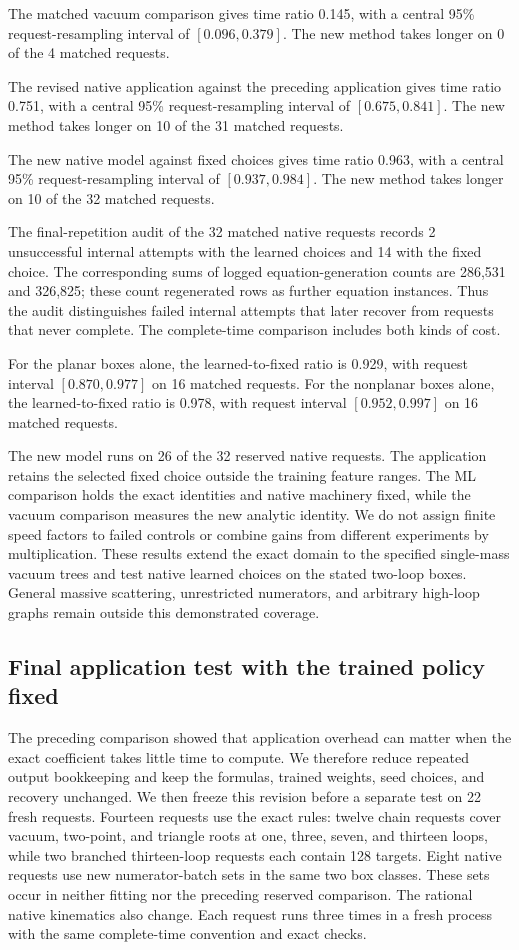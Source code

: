 The matched vacuum comparison gives time ratio 0.145, with a central 95\% request-resampling interval of $[0.096,0.379]$. The new method takes longer on 0 of the 4 matched requests.

The revised native application against the preceding application gives time ratio 0.751, with a central 95\% request-resampling interval of $[0.675,0.841]$. The new method takes longer on 10 of the 31 matched requests.

The new native model against fixed choices gives time ratio 0.963, with a central 95\% request-resampling interval of $[0.937,0.984]$. The new method takes longer on 10 of the 32 matched requests.

The final-repetition audit of the 32 matched native requests records 2 unsuccessful internal attempts with the learned choices and 14 with the fixed choice. The corresponding sums of logged equation-generation counts are 286,531 and 326,825; these count regenerated rows as further equation instances. Thus the audit distinguishes failed internal attempts that later recover from requests that never complete. The complete-time comparison includes both kinds of cost.

For the planar boxes alone, the learned-to-fixed ratio is 0.929, with request interval $[0.870,0.977]$ on 16 matched requests. For the nonplanar boxes alone, the learned-to-fixed ratio is 0.978, with request interval $[0.952,0.997]$ on 16 matched requests.

The new model runs on 26 of the 32 reserved native requests. The application retains the selected fixed choice outside the training feature ranges. The ML comparison holds the exact identities and native machinery fixed, while the vacuum comparison measures the new analytic identity. We do not assign finite speed factors to failed controls or combine gains from different experiments by multiplication. These results extend the exact domain to the specified single-mass vacuum trees and test native learned choices on the stated two-loop boxes. General massive scattering, unrestricted numerators, and arbitrary high-loop graphs remain outside this demonstrated coverage.

\subsection{Final application test with the trained policy fixed}
The preceding comparison showed that application overhead can matter when the exact coefficient takes little time to compute. We therefore reduce repeated output bookkeeping and keep the formulas, trained weights, seed choices, and recovery unchanged. We then freeze this revision before a separate test on 22 fresh requests. Fourteen requests use the exact rules: twelve chain requests cover vacuum, two-point, and triangle roots at one, three, seven, and thirteen loops, while two branched thirteen-loop requests each contain 128 targets. Eight native requests use new numerator-batch sets in the same two box classes. These sets occur in neither fitting nor the preceding reserved comparison. The rational native kinematics also change. Each request runs three times in a fresh process with the same complete-time convention and exact checks.

